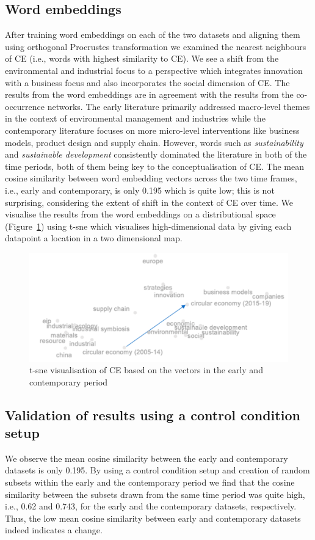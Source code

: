 \documentclass[output=paper]{langsci/langscibook}
\begin{document}
\subsection{Word embeddings}
After training word embeddings on each of the two datasets and aligning them using orthogonal Procrustes transformation we examined the nearest neighbours of CE (i.e., words with highest similarity to CE). We see a shift from the environmental and industrial focus to a perspective which integrates innovation with a business focus and also incorporates the social dimension of CE. The results from the word embeddings are in agreement with the results from the co-occurrence networks. The early literature primarily addressed macro-level themes in the context of environmental management and industries while the contemporary literature focuses on more micro-level interventions like business models, product design and supply chain. However, words such as \emph{sustainability} and \emph{sustainable development} consistently dominated the literature in both of the time periods, both of them being key to  the conceptualisation of CE. The mean cosine similarity between word embedding vectors across the two time frames, i.e., early and contemporary, is only 0.195 which is quite low; this is not surprising, considering the extent of shift in the context of CE over time. We visualise the results from the word embeddings on a distributional space (Figure~\ref{ch03:fig5}) using t-sne \citep{maaten2008visualizing}
which visualises high-dimensional data by giving each datapoint a location in a two dimensional map. 
\begin{figure}
\includegraphics[width=\textwidth]{figures/MAHANTY_tsne1.png}
\caption{t-sne visualisation of CE based on the vectors in the early and contemporary period }\label{ch03:fig5}
\end{figure}

\subsection{Validation of results using a control condition setup}\largerpage[-1]
We observe the mean cosine similarity between the early and contemporary datasets is only 0.195. By using a control condition setup and creation of random subsets within the early and the contemporary period we find that the cosine similarity between the subsets drawn from the same time period was quite high, i.e., 0.62 and 0.743, for the early and the contemporary datasets, respectively. Thus, the low mean cosine similarity between early and contemporary datasets indeed indicates a change. 
\end{document}
